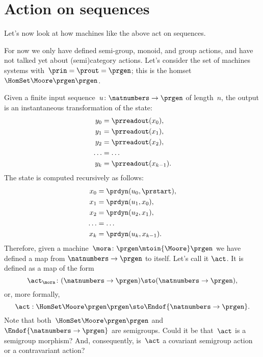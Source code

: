\section{Action on sequences}

Let's now look at how machines like the above act on sequences.

For now we only have defined semi-group, monoid, and group actions, and have not talked yet about (semi)category actions.
Let's consider the set of machines systems with~$\prin = \prout = \prgen$; this is the homset~$\HomSet\Moore\prgen\prgen$.

Given a finite input sequence~$u\colon \natnumbers \to \prgen$ of length~$n$, the output is an instantaneous transformation of the state:
%
\begin{equation}
    \label{eq:actions-on-sequences-y}
    \begin{aligned}
        y_0   & = \prreadout(x_0),     \\
        y_1   & = \prreadout(x_1),     \\
        y_2   & = \prreadout(x_2),     \\
        \dots & = \dots                \\
        y_{k} & = \prreadout(x_{k-1}).
    \end{aligned}
\end{equation}
%
The state is computed recursively as follows:
\begin{equation}
    \label{eq:actions-on-sequences-x}
    \begin{aligned}
        x_0   & = \prdyn(u_0, \prstart),  \\
        x_1   & = \prdyn(u_1, x_0),       \\
        x_2   & = \prdyn(u_2, x_1),       \\
        \dots & = \dots                   \\
        x_{k} & = \prdyn(u_{k}, x_{k-1}).
    \end{aligned}
\end{equation}
%
Therefore, given a machine~$\mora \colon \prgen \mtoin{\Moore} \prgen$ we have defined a map from $\natnumbers \to \prgen$ to itself.
Let's call it $\act$.
It is defined as a map of the form
%
\begin{equation}
    \label{eq:actions-on-sequences-1}
    \act_{\mora}\colon  (\natnumbers \to \prgen)  \sto  (\natnumbers \to \prgen),
\end{equation}
%
or, more formally,
%
\begin{equation}
    \label{eq:actions-on-sequences-2}
    \act: \HomSet\Moore\prgen\prgen \sto \Endof {\natnumbers \to \prgen}.
\end{equation}
%
Note that both~$\HomSet\Moore\prgen\prgen$ and $\Endof {\natnumbers \to \prgen}$ are semigroups.
Could it be that~$\act$ is a semigroup morphism?
And, consequently, is~$\act$ a covariant semigroup action or a contravariant action?

